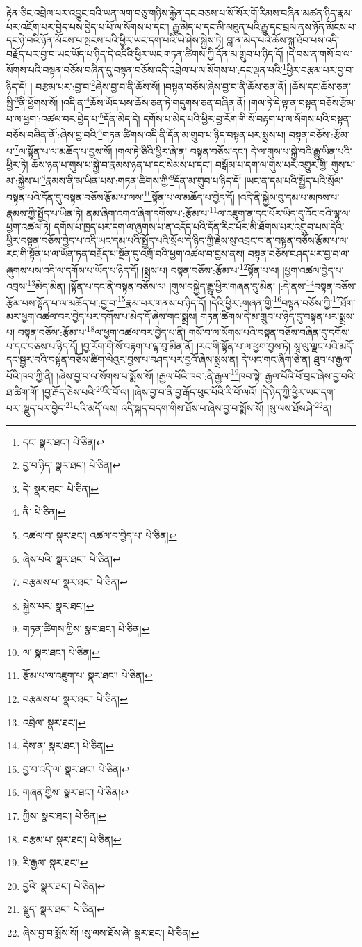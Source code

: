 རྟེན་ཅིང་འབྲེལ་པར་འབྱུང་བའི་ཡན་ལག་བཅུ་གཉིས་རྐྱེན་དང་བཅས་པ་སོ་སོར་གོ་རིམས་བཞིན་མཚན་ཉིད་རྣམ་པར་འཇོག་པར་བྱེད་པས་བྱེད་པ་པོ་ལ་སོགས་པ་དང་། རྒྱུ་མེད་པ་དང་མི་མཐུན་པའི་རྒྱུ་དང་བྲལ་ནས་ཉོན་མོངས་པ་དང་ཉེ་བའི་ཉོན་མོངས་པ་སྤངས་པའི་ཕྱིར་ཡང་དག་པའི་ཡེ་ཤེས་སྐྱེས་ཏེ། བླ་ན་མེད་པའི་ཆོས་སྐུ་ཐོབ་པས་འདི་བརྗོད་པར་བྱ་བ་ཡང་ཡོད་པ་ཉིད་དེ་འདིའི་ཕྱིར་ཡང་གཏན་ཚིགས་ཀྱི་དོན་མ་གྲུབ་པ་ཉིད་དོ། །དེ་བས་ན་གསོ་བ་ལ་སོགས་པའི་བསྟན་བཅོས་བཞིན་དུ་བསྟན་བཅོས་འདི་འབྲེལ་པ་ལ་སོགས་པ་:དང་ལྡན་པའི་\footnote{དང་  སྣར་ཐང་།  པེ་ཅིན། }ཕྱིར་བརྩམ་པར་བྱ་བ་ཉིད་དོ། །
བརྩམ་པར་:བྱ་བ་\footnote{བྱ་བ་ཉིད་  སྣར་ཐང་།  པེ་ཅིན། }ཞེས་བྱ་བ་ནི་ཆོས་སོ། །བསྟན་བཅོས་ཞེས་བྱ་བ་ནི་ཆོས་ཅན་ནོ། །ཆོས་དང་ཆོས་ཅན་སྤྱི་\footnote{དེ་  སྣར་ཐང་།  པེ་ཅིན། }ནི་ཕྱོགས་སོ། །འདི་ན་\footnote{ནི་  པེ་ཅིན། }ཆོས་ཡོད་པས་ཆོས་ཅན་ཏེ་གདུགས་ཅན་བཞིན་ནོ། །གལ་ཏེ་དེ་ལྟ་ན་བསྟན་བཅོས་རྩོམ་པ་ལ་ཕྱག་:འཚལ་བར་བྱེད་པ་\footnote{འཚལ་བ་  སྣར་ཐང་། འཚལ་བ་བྱེད་པ་  པེ་ཅིན། }དོན་མེད་དེ། དགོས་པ་མེད་པའི་ཕྱིར་བྱ་རོག་གི་སོ་བརྟག་པ་ལ་སོགས་པའི་བསྟན་བཅོས་བཞིན་ནོ་:ཞེས་བྱ་བའི་\footnote{ཞེས་པའི་  སྣར་ཐང་།  པེ་ཅིན། }གཏན་ཚིགས་འདི་ནི་དོན་མ་གྲུབ་པ་ཉིད་བསྟན་པར་སྨྲས་པ། བསྟན་བཅོས་:རྩོམ་པ་\footnote{བརྩམས་པ་  སྣར་ཐང་།  པེ་ཅིན། }ལ་སྟོན་པ་ལ་མཆོད་པ་བྱས་སོ། །གལ་ཏེ་ཅིའི་ཕྱིར་ཞེ་ན། བསྟན་བཅོས་དང་། དེ་ལ་གུས་པ་སྐྱེ་བའི་རྒྱུ་ཡིན་པའི་ཕྱིར་ཏེ། ཆོས་ཉན་པ་གུས་པ་སྐྱེ་བ་རྣམས་ཉན་པ་དང་སེམས་པ་དང་། བསྒོམ་པ་དག་ལ་གུས་པར་འགྱུར་གྱི། གུས་པ་མ་:སྐྱེས་པ་\footnote{སྐྱེས་པར་  སྣར་ཐང་། }རྣམས་ནི་མ་ཡིན་པས་:གཏན་ཚིགས་ཀྱི་\footnote{གཏན་ཚིགས་ཀྱིས་  སྣར་ཐང་།  པེ་ཅིན། }དོན་མ་གྲུབ་པ་ཉིད་དོ། །ཡང་ན་དམ་པའི་སྤྱོད་པའི་སྲོལ་བསྟན་པའི་དོན་དུ་བསྟན་བཅོས་རྩོམ་པ་ལས་\footnote{ལ་  སྣར་ཐང་།  པེ་ཅིན། }སྟོན་པ་ལ་མཆོད་པ་བྱེད་དོ། །འདི་ནི་སྐྱེས་བུ་དམ་པ་མཁས་པ་རྣམས་ཀྱི་སྤྱོད་པ་ཡིན་ཏེ། ནམ་ཞིག་འགའ་ཞིག་དགོས་པ་:རྩོམ་པ་\footnote{རྩོམ་པ་ལ་འཇུག་པ་  སྣར་ཐང་།  པེ་ཅིན། }ལ་འཇུག་ན་དང་པོར་ཡིད་དུ་འོང་བའི་ལྷ་ལ་ཕྱག་འཚལ་ཏེ། དགོས་པ་ཁྱད་པར་དག་ལ་ཞུགས་པ་ན་འདོད་པའི་དོན་རིང་པོར་མི་ཐོགས་པར་འགྲུབ་པས་དེའི་ཕྱིར་བསྟན་བཅོས་བྱེད་པ་འདི་ཡང་དམ་པའི་སྤྱོད་པའི་སྲོལ་དེ་ཉིད་ཀྱི་རྗེས་སུ་འབྲང་བ་ན་བསྟན་བཅོས་རྩོམ་པ་ལ་རང་གི་སྟོན་པ་ལ་ཡོན་ཏན་བརྗོད་པ་སྔོན་དུ་འགྲོ་བའི་ཕྱག་འཚལ་བ་བྱས་ནས། བསྟན་བཅོས་བཤད་པར་བྱ་བ་ལ་ཞུགས་པས་འདི་ལ་དགོས་པ་ཡོད་པ་ཉིད་དོ། །སྨྲས་པ། བསྟན་བཅོས་:རྩོམ་པ་\footnote{བརྩམས་པ་  སྣར་ཐང་།  པེ་ཅིན། }སྟོན་པ་ལ། །ཕྱག་འཚལ་བྱེད་པ་འབྲས་\footnote{འབྲེལ་  སྣར་ཐང་། }མེད་མིན། །སྟོན་པ་དང་ནི་བསྟན་བཅོས་ལ། །གུས་བསྐྱེད་རྒྱུ་ཕྱིར་གཞན་དུ་མིན། །:དེ་ནས་\footnote{དེས་ན་  སྣར་ཐང་།  པེ་ཅིན། }བསྟན་བཅོས་རྩོམ་པས་སྟོན་པ་ལ་མཆོད་པ་:བྱ་བ་\footnote{བྱ་བ་འདི་ལ་  སྣར་ཐང་།  པེ་ཅིན། }རྣམ་པར་གནས་པ་ཉིད་དོ། །དེའི་ཕྱིར་:གཞན་གྱི་\footnote{གཞན་གྱིས་  སྣར་ཐང་།  པེ་ཅིན། }བསྟན་བཅོས་ཀྱི་\footnote{ཀྱིས་  སྣར་ཐང་།  པེ་ཅིན། }ཐོག་མར་ཕྱག་འཚལ་བར་བྱེད་པར་དགོས་པ་མེད་དོ་ཞེས་གང་སྨྲས། གཏན་ཚིགས་དེ་མ་གྲུབ་པ་ཉིད་དུ་བསྟན་པར་སྨྲས་པ། བསྟན་བཅོས་:རྩོམ་པ་\footnote{བརྩམ་པ་  སྣར་ཐང་།  པེ་ཅིན། }ལ་ཕྱག་འཚལ་བར་བྱེད་པ་ནི། གསོ་བ་ལ་སོགས་པའི་བསྟན་བཅོས་བཞིན་དུ་དགོས་པ་དང་བཅས་པ་ཉིད་དོ། །བྱ་རོག་གི་སོ་བརྟག་པ་ལྟ་བུ་མིན་ནོ། །རང་གི་སྟོན་པ་ལ་ཕྱག་བྱས་ཏེ། སཱ་ལུ་ལྗང་པའི་མདོ་དང་སྦྱར་བའི་བསྟན་བཅོས་ཚིག་ལེའུར་བྱས་པ་བཤད་པར་བྱའོ་ཞེས་སྨྲས་ན། དེ་ཡང་གང་ཞིག་ཅེ་ན། ཐུབ་པ་རྒྱལ་པོའི་ཁབ་ཀྱི་ནི། །ཞེས་བྱ་བ་ལ་སོགས་པ་སྨོས་སོ། །རྒྱལ་པོའི་ཁབ་:ནི་རྒྱལ་\footnote{རི་རྒྱལ་  སྣར་ཐང་། }ཁབ་སྟེ། རྒྱལ་པོའི་ཕོ་བྲང་ཞེས་བྱ་བའི་ཐ་ཚིག་གོ། །བྱ་རྒོད་ཅེས་པའི་\footnote{བྱའི་  སྣར་ཐང་།  པེ་ཅིན། }རི་བོ་ལ། །ཞེས་བྱ་བ་ནི་བྱ་རྒོད་ཕུང་པོའི་རི་བོ་ལའོ། །དེ་ཉིད་ཀྱི་ཕྱིར་ཡང་དག་པར་:སྡུད་པར་བྱེད་\footnote{སྡུད་  སྣར་ཐང་།  པེ་ཅིན། }པའི་མདོ་ལས། འདི་སྐད་བདག་གིས་ཐོས་པ་ཞེས་བྱ་བ་སྨོས་སོ། །སུ་ལས་ཐོས་ཤེ་\footnote{ཞེས་བྱ་བ་སྨོས་སོ། །སུ་ལས་ཐོས་ཞེ་  སྣར་ཐང་།  པེ་ཅིན། }ན། 